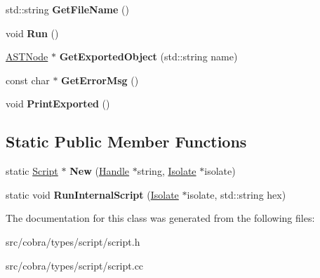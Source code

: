 \begin{DoxyCompactItemize}
\item 
\hypertarget{class_cobra_1_1internal_1_1_script_a7597bd8421590bcbe0d6e585630df934}{std\+::string {\bfseries Get\+File\+Name} ()}\label{class_cobra_1_1internal_1_1_script_a7597bd8421590bcbe0d6e585630df934}

\item 
\hypertarget{class_cobra_1_1internal_1_1_script_a317a0a111e63fd90cc64c46fbcf32c88}{void {\bfseries Run} ()}\label{class_cobra_1_1internal_1_1_script_a317a0a111e63fd90cc64c46fbcf32c88}

\item 
\hypertarget{class_cobra_1_1internal_1_1_script_a155b321997e1c205a1a139b05ff8b337}{\hyperlink{class_cobra_1_1internal_1_1_a_s_t_node}{A\+S\+T\+Node} $\ast$ {\bfseries Get\+Exported\+Object} (std\+::string name)}\label{class_cobra_1_1internal_1_1_script_a155b321997e1c205a1a139b05ff8b337}

\item 
\hypertarget{class_cobra_1_1internal_1_1_script_abf05fe74250cc1b39a5a9643eebd5ee8}{const char $\ast$ {\bfseries Get\+Error\+Msg} ()}\label{class_cobra_1_1internal_1_1_script_abf05fe74250cc1b39a5a9643eebd5ee8}

\item 
\hypertarget{class_cobra_1_1internal_1_1_script_af74813d641549b9c43612ddb10ff7c6f}{void {\bfseries Print\+Exported} ()}\label{class_cobra_1_1internal_1_1_script_af74813d641549b9c43612ddb10ff7c6f}

\end{DoxyCompactItemize}
\subsection*{Static Public Member Functions}
\begin{DoxyCompactItemize}
\item 
\hypertarget{class_cobra_1_1internal_1_1_script_aba7470586af2f7a3c9ab8b25aebfdcbb}{static \hyperlink{class_cobra_1_1internal_1_1_script}{Script} $\ast$ {\bfseries New} (\hyperlink{class_cobra_1_1internal_1_1_handle}{Handle} $\ast$string, \hyperlink{class_cobra_1_1internal_1_1_isolate}{Isolate} $\ast$isolate)}\label{class_cobra_1_1internal_1_1_script_aba7470586af2f7a3c9ab8b25aebfdcbb}

\item 
\hypertarget{class_cobra_1_1internal_1_1_script_acfb2406b71e6ad051e514fa834a6cf28}{static void {\bfseries Run\+Internal\+Script} (\hyperlink{class_cobra_1_1internal_1_1_isolate}{Isolate} $\ast$isolate, std\+::string hex)}\label{class_cobra_1_1internal_1_1_script_acfb2406b71e6ad051e514fa834a6cf28}

\end{DoxyCompactItemize}


The documentation for this class was generated from the following files\+:\begin{DoxyCompactItemize}
\item 
src/cobra/types/script/script.\+h\item 
src/cobra/types/script/script.\+cc\end{DoxyCompactItemize}
